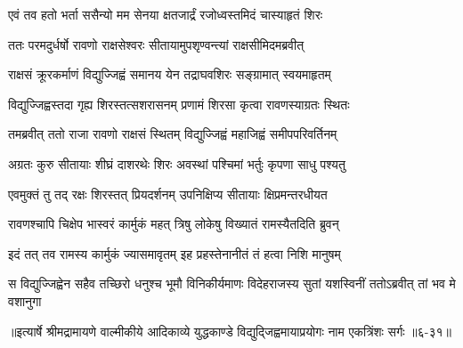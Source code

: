 \twolineshloka
{एवं तव हतो भर्ता ससैन्यो मम सेनया}
{क्षतजार्द्रं रजोध्वस्तमिदं चास्याहृतं शिरः} %

\twolineshloka
{ततः परमदुर्धर्षो रावणो राक्षसेश्वरः}
{सीतायामुपशृण्वन्त्यां राक्षसीमिदमब्रवीत्} %

\twolineshloka
{राक्षसं क्रूरकर्माणं विद्युज्जिह्वं समानय}
{येन तद्राघवशिरः सङ्ग्रामात् स्वयमाहृतम्} %

\twolineshloka
{विद्युज्जिह्वस्तदा गृह्य शिरस्तत्सशरासनम्}
{प्रणामं शिरसा कृत्वा रावणस्याग्रतः स्थितः} %

\twolineshloka
{तमब्रवीत् ततो राजा रावणो राक्षसं स्थितम्}
{विद्युज्जिह्वं महाजिह्वं समीपपरिवर्तिनम्} %

\twolineshloka
{अग्रतः कुरु सीतायाः शीघ्रं दाशरथेः शिरः}
{अवस्थां पश्चिमां भर्तुः कृपणा साधु पश्यतु} %

\twolineshloka
{एवमुक्तं तु तद् रक्षः शिरस्तत् प्रियदर्शनम्}
{उपनिक्षिप्य सीतायाः क्षिप्रमन्तरधीयत} %

\twolineshloka
{रावणश्चापि चिक्षेप भास्वरं कार्मुकं महत्}
{त्रिषु लोकेषु विख्यातं रामस्यैतदिति ब्रुवन्} %

\twolineshloka
{इदं तत् तव रामस्य कार्मुकं ज्यासमावृतम्}
{इह प्रहस्तेनानीतं तं हत्वा निशि मानुषम्} %

\twolineshloka
{स विद्युज्जिह्वेन सहैव तच्छिरो धनुश्च भूमौ विनिकीर्यमाणः}
{विदेहराजस्य सुतां यशस्विनीं ततोऽब्रवीत् तां भव मे वशानुगा} %


॥इत्यार्षे श्रीमद्रामायणे वाल्मीकीये आदिकाव्ये युद्धकाण्डे विद्युद्जिह्वमायाप्रयोगः नाम एकत्रिंशः सर्गः ॥६-३१॥
